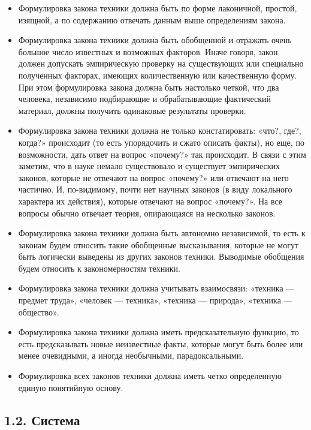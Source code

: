 \documentclass[11pt,a4paper]{article}
\begin{document}
\begin{itemize}
\item Формулировка закона техники должна быть по форме лаконичной, простой,
  изящной, а по содержанию отвечать данным выше определениям закона.
\item Формулировка закона техники должна быть обобщенной и отражать очень
  большое число известных и возможных факторов. Иначе говоря, закон должен
  допускать эмпирическую проверку на существующих или специально полученных
  факторах, имеющих количественную или качественную форму. При этом
  формулировка закона должна быть настолько четкой, что два человека,
  независимо подбирающие и обрабатывающие фактический материал, должны
  получить одинаковые результаты проверки.
\item Формулировка закона техники должна не только констатировать: «что?,
  где?, когда?» происходит (то есть упорядочить и сжато описать факты), но
  еще, по возможности, дать ответ на вопрос «почему?» так происходит. В связи
  с этим заметим, что в науке немало существовало и существует эмпирических
  законов, которые не отвечают на вопрос «почему?» или отвечают на него
  частично. И, по-видимому, почти нет научных законов (в виду локального
  характера их действия), которые отвечают на вопрос «почему?». На все вопросы
  обычно отвечает теория, опирающаяся на несколько законов.
\item Формулировка закона техники должна быть автономно независимой, то есть к
  законам будем относить такие обобщенные высказывания, которые не могут быть
  логически выведены из других законов техники. Выводимые обобщения будем
  относить к закономерностям техники.
\item Формулировка закона техники должна учитывать взаимосвязи: «техника —
  предмет труда», «человек — техника», «техника — природа», «техника —
  общество».
\item Формулировка закона техники должна иметь предсказательную функцию, то
  есть предсказывать новые неизвестные факты, которые могут быть более или
  менее очевидными, а иногда необычными, парадоксальными.
\item Формулировка всех законов техники должна иметь четко определенную единую
  понятийную основу.
\end{itemize}

\subsection*{1.2. Система}
\end{document}
